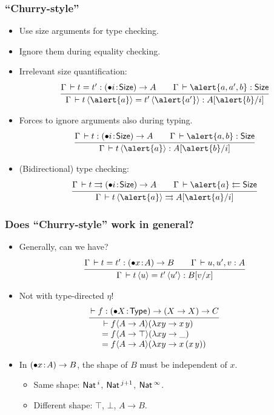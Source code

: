 \documentclass[t,fleqn]{beamer}
\makeatletter
\renewcommand{\ru}[2]{\dfrac{\begin{array}[b]{@{}c@{}} #1 \end{array}}{\begin{array}[t]{@{}l@{}} #2 \end{array}}}
\newcommand{\cAnn}{\color{red!80!black}}%
\renewcommand{\emph}[1]{{\cAnn#1}}
\newcommand{\irr}{\mathord{\bullet}}
\renewcommand{\erhyp}[3][\irr]{#1#2 \of #3}
\renewcommand{\erfunT}[4][\irr]{(\erhyp[#1]{#2}{#3}) \to #4}
\makeatother
\begin{document}
\begin{frame}%
  \frametitle{``Churry-style''}
  \begin{itemize}
  \item Use size arguments for \emph{type checking}.
  \item Ignore them during \emph{equality checking}.
  \item Irrelevant size quantification:
\[
  \ru{\Gamma \der t = t' : \erfunT i \Size A \qquad
      \Gamma \der \alert{a,a',b} : \Size
    }{\Gamma \der t\,\ann{\alert{a}} = t'\,\ann{\alert{a'}} : A[\alert{b}/i]
    }
\]
\vspace{-2ex}
  \item Forces to ignore arguments also during \emph{typing}.
\[
  \ru{\Gamma \der t : \erfunT i \Size A \qquad
      \Gamma \der \alert{a,b} : \Size
    }{\Gamma \der t\,\ann{\alert{a}} : A[\alert{b}/i]
    }
\]
\vspace{-2ex}
\item (Bidirectional) \emph{type checking}:
\[
  \ru{\Gamma \der t \jinf\erfunT i \Size A \qquad
      \Gamma \der \alert{a} \jchk \Size
    }{\Gamma \der t\,\ann{\alert{a}} \jinf A[\alert{a}/i]
    }
\]
\vspace{-2ex}
  \end{itemize}
\end{frame}


\begin{frame}%
  \frametitle{Does ``Churry-style'' work in general?}
  \begin{itemize}
  \item Generally, can we have?
\[
  \ru{\Gamma \der t = t' : \erfunT x A B\qquad
      \Gamma \der u,u',v : A
    }{\Gamma \der t\,\ann u = t'\,\ann{u'} : B[v/x]
    }
\]
\vspace{-2ex}
  \item Not with type-directed $\eta$!
\[
\hspace{-\leftmargin}
\ru{\der f : \erfunT X \Type (X \to X) \to C
  }{\der
    f \ann {A \to A} (\lambda x y \to x\,y) \\ =
    f \ann {A \to \top} (\lambda x y \to \_) \\ =
    f \ann {A \to A} (\lambda x y \to x\,(x\,y))
  }
\]
\vspace{-2ex}
  \item In $\erfunT x A B$, the \emph{shape} of $B$ must be
    independent of $x$.
    \begin{itemize}
    \item Same shape: $\mathsf{Nat}\,^i$, $\mathsf{Nat}\,^{j+1}$, $\mathsf{Nat}\,^\infty$.
    \item Different shape: $\top$, $\bot$, $A \to B$.
    \end{itemize}
\end{itemize}
\end{frame}
\end{document}
